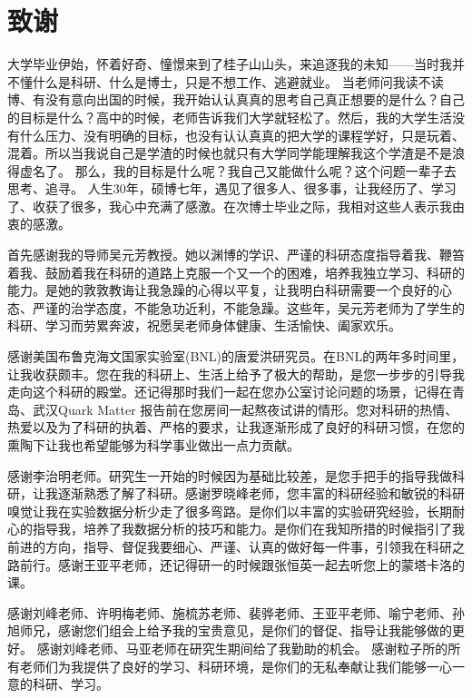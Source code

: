 \chapter*{致谢}
\setcounter{section}{0}
\setcounter{figure}{0}
\setcounter{table}{0}
\setcounter{equation}{0}



大学毕业伊始，怀着好奇、憧憬来到了桂子山山头，来追逐我的未知——当时我并不懂什么是科研、什么是博士，只是不想工作、逃避就业。
当老师问我读不读博、有没有意向出国的时候，我开始认认真真的思考自己真正想要的是什么？自己的目标是什么？高中的时候，老师告诉我们大学就轻松了。然后，我的大学生活没有什么压力、没有明确的目标，也没有认认真真的把大学的课程学好，只是玩着、混着。所以当我说自己是学渣的时候也就只有大学同学能理解我这个学渣是不是浪得虚名了。
那么，我的目标是什么呢？我自己又能做什么呢？这个问题一辈子去思考、追寻。
人生30年，硕博七年，遇见了很多人、很多事，让我经历了、学习了、收获了很多，我心中充满了感激。在次博士毕业之际，我相对这些人表示我由衷的感激。


首先感谢我的导师吴元芳教授。她以渊博的学识、严谨的科研态度指导着我、鞭笞着我、鼓励着我在科研的道路上克服一个又一个的困难，培养我独立学习、科研的能力。是她的敦敦教诲让我急躁的心得以平复，让我明白科研需要一个良好的心态、严谨的治学态度，不能急功近利，不能急躁。这些年，吴元芳老师为了学生的科研、学习而劳累奔波，祝愿吴老师身体健康、生活愉快、阖家欢乐。

感谢美国布鲁克海文国家实验室(BNL)的唐爱洪研究员。在BNL的两年多时间里，让我收获颇丰。您在我的科研上、生活上给予了极大的帮助，是您一步步的引导我走向这个科研的殿堂。还记得那时我们一起在您办公室讨论问题的场景，记得在青岛、武汉Quark Matter 报告前在您房间一起熬夜试讲的情形。您对科研的热情、热爱以及为了科研的执着、严格的要求，让我逐渐形成了良好的科研习惯，在您的熏陶下让我也希望能够为科学事业做出一点力贡献。

感谢李治明老师。研究生一开始的时候因为基础比较差，是您手把手的指导我做科研，让我逐渐熟悉了解了科研。感谢罗晓峰老师，您丰富的科研经验和敏锐的科研嗅觉让我在实验数据分析少走了很多弯路。是你们以丰富的实验研究经验，长期耐心的指导我，培养了我数据分析的技巧和能力。是你们在我知所措的时候指引了我前进的方向，指导、督促我要细心、严谨、认真的做好每一件事，引领我在科研之路前行。感谢王亚平老师，还记得研一的时候跟张恒英一起去听您上的蒙塔卡洛的课。


感谢刘峰老师、许明梅老师、施梳苏老师、裴骅老师、王亚平老师、喻宁老师、孙旭师兄，感谢您们组会上给予我的宝贵意见，是你们的督促、指导让我能够做的更好。
感谢刘峰老师、马亚老师在研究生期间给了我勤助的机会。
感谢粒子所的所有老师们为我提供了良好的学习、科研环境，是你们的无私奉献让我们能够一心一意的科研、学习。

